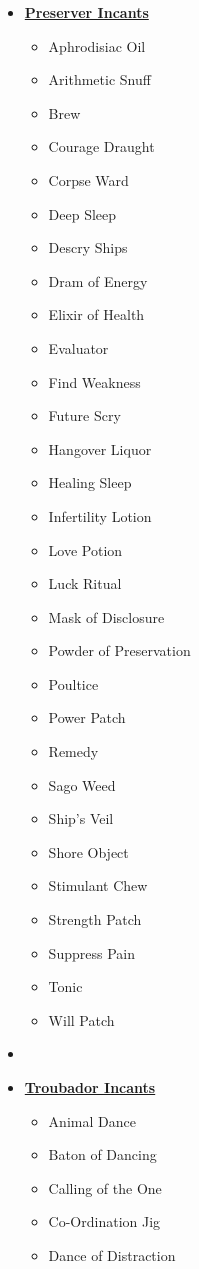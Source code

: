 \begin{multicols*}{4}
\begin{itemize}[leftmargin=0pt]
	\item[] \textbf{\ul{Preserver Incants}}
	\begin{itemize}[leftmargin=0pt]
		\item[] Aphrodisiac Oil
		\item[] Arithmetic Snuff
		\item[] Brew
		\item[] Courage Draught
		\item[] Corpse Ward
		\item[] Deep Sleep
		\item[] Descry Ships
		\item[] Dram of Energy
		\item[] Elixir of Health
		\item[] Evaluator
		\item[] Find Weakness
		\item[] Future Scry
		\item[] Hangover Liquor
		\item[] Healing Sleep
		\item[] Infertility Lotion
		\item[] Love Potion
		\item[] Luck Ritual
		\item[] Mask of Disclosure
		\item[] Powder of Preservation
		\item[] Poultice
		\item[] Power Patch
		\item[] Remedy
		\item[] Sago Weed
		\item[] Ship's Veil
		\item[] Shore Object
		\item[] Stimulant Chew
		\item[] Strength Patch
		\item[] Suppress Pain
		\item[] Tonic
		\item[] Will Patch
	\end{itemize}
	\item[] 
	\item[] \textbf{\ul{Troubador Incants}}
	\begin{itemize}[leftmargin=0pt]
		\item[] Animal Dance
		\item[] Baton of Dancing
		\item[] Calling of the One
		\item[] Co-Ordination Jig
		\item[] Dance of Distraction

\end{itemize}
\end{itemize}
\end{multicols*}
